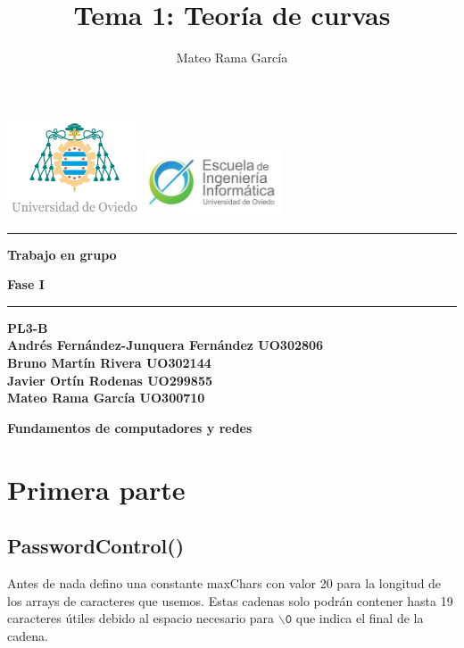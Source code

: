 \documentclass[11pt,a4paper]{article}
\title{\textbf{Tema 1: } Teoría de curvas}
\author{Mateo Rama García}
\begin{document}
  
\begin{titlepage}
  \centering  
  \vspace*{1cm}  %
  \includegraphics[width=0.3\textwidth]{uniovi.jpg} \hspace{2cm}
  \includegraphics[width=0.3\textwidth]{descarga.jpeg} \\[1cm] 
  \vspace{\fill}%
  \hrule
  \vspace{0.5cm}
  {\Huge \bfseries Trabajo en grupo\par}
  \vspace{0.5cm}
  {\Large \bfseries Fase I\par}
  \vspace{0.5cm}
  \hrule
  \vspace{1cm}
  {\bfseries PL3-B \\ [3ex]
  Andrés Fernández-Junquera Fernández UO302806\\[3ex]
  Bruno Martín Rivera UO302144\\[3ex]
  Javier Ortín Rodenas UO299855\\[3ex]
  Mateo Rama García UO300710\par} %
  \vspace{\fill}  %
  {\Large \textbf{Fundamentos de computadores y redes}\par}
\end{titlepage}



\newpage

\tableofcontents

\newpage


\section{Primera parte}
\subsection{PasswordControl()}
Antes de nada defino una constante maxChars con valor 20 para la longitud de los arrays de caracteres que usemos. Estas cadenas solo podrán contener hasta 19 caracteres útiles debido al espacio necesario para \(\backslash \texttt{0}\) que indica el final de la cadena.
\end{document}
